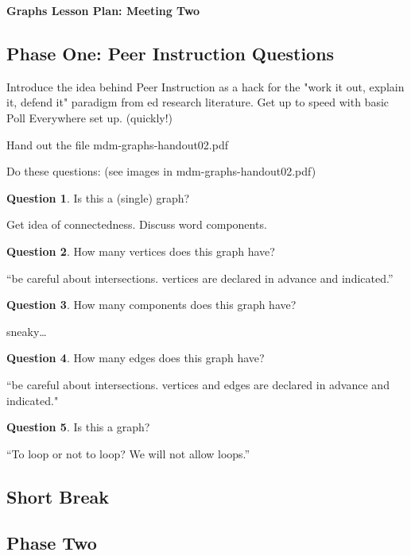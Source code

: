 \documentclass[12pt]{amsart}
\theoremstyle{definition}
\newtheorem{question}{Question}
\begin{document}
\begin{center}
\textbf{\Huge
Graphs Lesson Plan: Meeting Two
}
\end{center}
\vspace{.5in}

\subsection*{Phase One: Peer Instruction Questions}

Introduce the idea behind Peer Instruction as a hack for the "work it out, explain it, defend it" paradigm from ed research literature. Get up to speed with basic Poll Everywhere set up. (quickly!) 

Hand out the file mdm-graphs-handout02.pdf

Do these questions: (see images in mdm-graphs-handout02.pdf)

\begin{question}
Is this a (single) graph?
\end{question}

Get idea of connectedness. Discuss word components.

\begin{question}
How many vertices does this graph have?
\end{question}

``be careful about intersections. vertices are declared in advance and indicated.''

\begin{question}
How many components does this graph have?
\end{question}

sneaky\dots

\begin{question}
How many edges does this graph have?
\end{question}

``be careful about intersections. vertices and edges are declared in advance and indicated."

\begin{question}
Is this a graph?
\end{question}

``To loop or not to loop? We will not allow loops.''

\subsection*{Short Break}

\subsection*{Phase Two}
\end{document}
